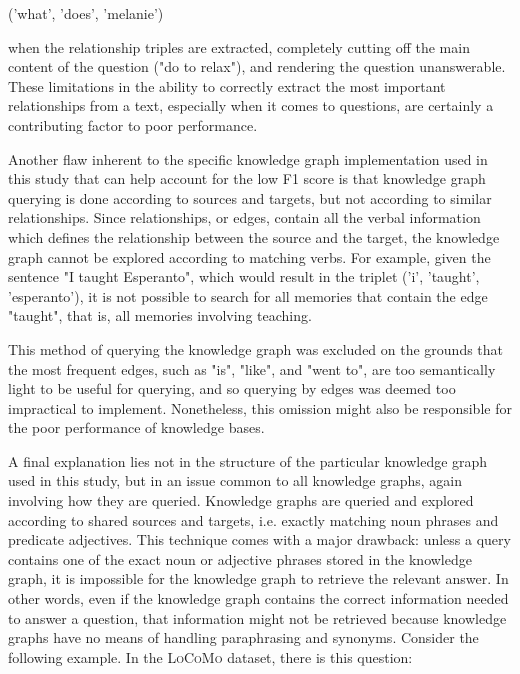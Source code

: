 \begin{displayquote}
('what', 'does', 'melanie')
\end{displayquote}

\noindent when the relationship triples are extracted, completely cutting off the main content of the question ("do to relax"), and rendering the question unanswerable. These limitations in the ability to correctly extract the most important relationships from a text, especially when it comes to questions, are certainly a contributing factor to poor performance.

Another flaw inherent to the specific knowledge graph implementation used in this study that can help account for the low F1 score is that knowledge graph querying is done according to sources and targets, but not according to similar relationships. Since relationships, or edges, contain all the verbal information which defines the relationship between the source and the target, the knowledge graph cannot be explored according to matching verbs. For example, given the sentence "I taught Esperanto", which would result in the triplet ('i', 'taught', 'esperanto'), it is not possible to search for all memories that contain the edge "taught", that is, all memories involving teaching.

This method of querying the knowledge graph was excluded on the grounds that the most frequent edges, such as "is", "like", and "went to", are too semantically light to be useful for querying, and so querying by edges was deemed too impractical to implement. Nonetheless, this omission might also be responsible for the poor performance of knowledge bases.

A final explanation lies not in the structure of the particular knowledge graph used in this study, but in an issue common to all knowledge graphs, again involving how they are queried. Knowledge graphs are queried and explored according to shared sources and targets, i.e. exactly matching noun phrases and predicate adjectives. This technique comes with a major drawback: unless a query contains one of the exact noun or adjective phrases stored in the knowledge graph, it is impossible for the knowledge graph to retrieve the relevant answer. In other words, even if the knowledge graph contains the correct information needed to answer a question, that information might not be retrieved because knowledge graphs have no means of handling paraphrasing and synonyms. Consider the following example. In the \textsc{LoCoMo} dataset, there is this question:\\


